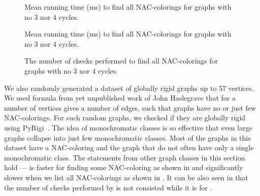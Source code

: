 \begin{figure}[p]
	\centering
	\scalebox{0.5}{}
	\caption[Mean runtime for graphs with no 3 nor 4 cycles (some).]{
		Mean running time (ms) to find all NAC-colorings for graphs with no 3 nor 4 cycles.}%
	\label{fig:graph_count_no_3_nor_4_cycles_first_runtime}
\end{figure}
\begin{figure}[p]
	\centering
	\scalebox{0.5}{}
	\caption[Mean runtime for graphs with no 3 nor 4 cycles (all).]{
		Mean running time (ms) to find all NAC-colorings for graphs with no 3 nor 4 cycles.}%
	\label{fig:graph_count_no_3_nor_4_cycles_all_runtime}
\end{figure}
\begin{figure}[p]
	\centering
	\scalebox{0.5}{}
	\caption[Checks performed for graphs with no 3 nor 4 cycles (all).]{
		The number of checks performed to find all NAC-colorings for graphs with no 3 nor 4 cycles.}%
	\label{fig:graph_count_no_3_nor_4_cycles_all_checks}
\end{figure}


We also randomly generated a dataset of globally rigid graphs
up to 57 vertices.
We used formula from yet unpublished work of John Haslegrave
that for a number of vertices gives a number of edges,
such that graphs have no or just few NAC-colorings.
For such random graphs, we checked if they are globally rigid using PyRigi~\cite{pyrigi}.
%
The idea of monochromatic classes is so effective
that even large graphs collapse into just few monochromatic classes.
Most of the graphs in this dataset have a NAC-coloring
and the graph that do not often have only a single monochromatic class.
The statements from other graph classes in this section hold
--- \NaiveCycles{} is faster for finding some NAC-coloring
as shown in 
and significantly slower when we list all NAC-colorings
as shown in .
It can be also seen in 
that the number of checks performed
by \NaiveCycles{} is not consisted while it is for \Subgraphs{}.


